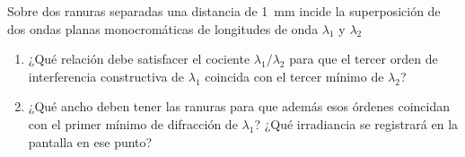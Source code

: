 \item Sobre dos ranuras separadas una distancia de \SI{1}{\milli\metre} incide la superposición de dos ondas planas monocromáticas de longitudes de onda $\lambda_1$ y $\lambda_2$
\begin{enumerate}
	\item ¿Qué relación debe satisfacer el cociente $\lambda_1/\lambda_2$ para que el tercer orden de interferencia constructiva de $\lambda_1$ coincida con el tercer mínimo de $\lambda_2$? 
	\item ¿Qué ancho deben tener las ranuras para que además esos órdenes coincidan con el primer mínimo de difracción de $\lambda_1$?
	¿Qué irradiancia se registrará en la pantalla en ese punto? 
\end{enumerate}
